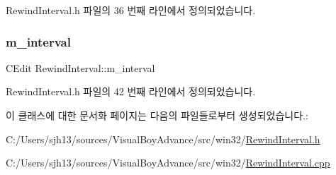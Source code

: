 Rewind\+Interval.\+h 파일의 36 번째 라인에서 정의되었습니다.

\mbox{\label{class_rewind_interval_a67355ee1278bb5827beca804a2e2fcb5}} 
\subsubsection{\texorpdfstring{m\+\_\+interval}{m\_interval}}
{\footnotesize\ttfamily C\+Edit Rewind\+Interval\+::m\+\_\+interval}



Rewind\+Interval.\+h 파일의 42 번째 라인에서 정의되었습니다.



이 클래스에 대한 문서화 페이지는 다음의 파일들로부터 생성되었습니다.\+:\begin{DoxyCompactItemize}
\item 
C\+:/\+Users/sjh13/sources/\+Visual\+Boy\+Advance/src/win32/\mbox{\hyperlink{_rewind_interval_8h}{Rewind\+Interval.\+h}}\item 
C\+:/\+Users/sjh13/sources/\+Visual\+Boy\+Advance/src/win32/\mbox{\hyperlink{_rewind_interval_8cpp}{Rewind\+Interval.\+cpp}}\end{DoxyCompactItemize}
